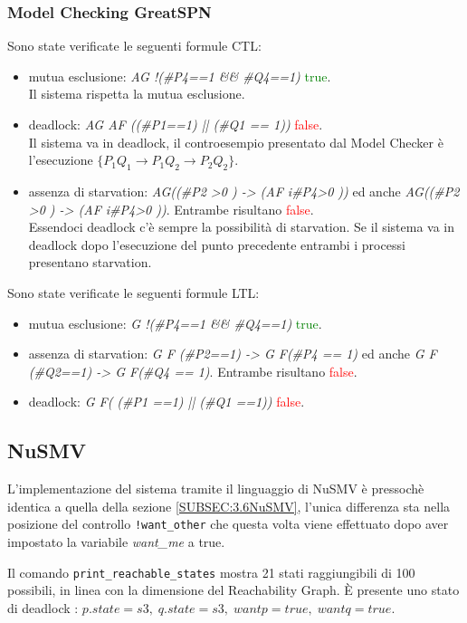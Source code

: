 \documentclass[a4paper]{article}
\begin{document}
\subsubsection{Model Checking GreatSPN}
Sono state verificate le seguenti formule CTL:
\begin{itemize}
	\item mutua esclusione: \textit{AG !(\#P4==1 \&\& \#Q4==1)} \textcolor{green}{true}.\\
		Il sistema rispetta la mutua esclusione.
	\item deadlock: \textit{AG AF ((\#P1==1) || (\#Q1 == 1))} \textcolor{red}{false}.\\
		Il sistema va in deadlock, il controesempio presentato dal Model Checker è l'esecuzione $\{P_1Q_1 \rightarrow P_1Q_2 \rightarrow P_2Q_2\}$.
	\item assenza di starvation: \textit{AG((\#P2 >0 ) -> (AF i\#P4>0 ))} ed anche \textit{AG((\#P2 >0 ) -> (AF i\#P4>0 ))}. Entrambe risultano \textcolor{red}{false}.\\
		Essendoci deadlock c'è sempre la possibilità di starvation. Se il sistema va in deadlock dopo l'esecuzione del punto precedente entrambi i processi presentano starvation.
\end{itemize}
Sono state verificate le seguenti formule LTL:
\begin{itemize}
	\item mutua esclusione: \textit{G !(\#P4==1 \&\& \#Q4==1)} \textcolor{green}{true}.
	\item assenza di starvation: \textit{G F (\#P2==1) -> G F(\#P4 == 1)} ed anche \textit{G F (\#Q2==1) -> G F(\#Q4 == 1)}. Entrambe risultano \textcolor{red}{false}.\\
	\item deadlock: \textit{G F( (\#P1 ==1) ||  (\#Q1 ==1))} \textcolor{red}{false}.
\end{itemize}

\subsection{NuSMV}
L'implementazione del sistema tramite il linguaggio di NuSMV è pressochè identica a quella della sezione \ref{SUBSEC:3.6NuSMV}, l'unica differenza sta nella posizione del controllo \texttt{!want\_other} che questa volta viene effettuato dopo aver impostato la variabile \textit{want\_me} a true.

Il comando \texttt{print\_reachable\_states} mostra 21 stati raggiungibili di 100 possibili, in linea con la dimensione del Reachability Graph.
È presente uno stato di deadlock : $p.state=s3, \; q.state=s3, \; wantp = true, \; wantq = true $. 
\end{document}
